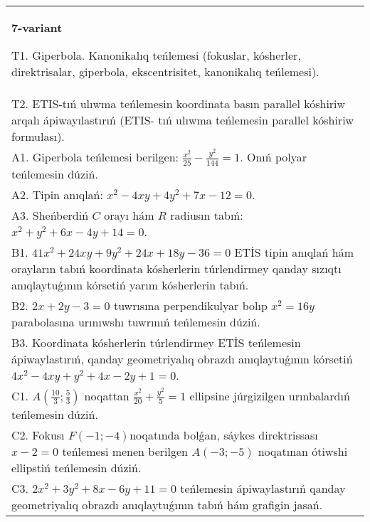 \documentclass{article}
\begin{document}
\begin{tabular}{m{17cm}}
\textbf{7-variant}
\newline

T1. Giperbola. Kanonikalıq teńlemesi (fokuslar, kósherler, direktrisalar, giperbola, ekscentrisitet, kanonikalıq teńlemesi).\\

T2. ETIS-tıń ulıwma teńlemesin koordinata basın parallel kóshiriw arqalı ápiwayılastırıń (ETIS- tıń ulıwma teńlemesin parallel kóshiriw formulası).\\

A1. Giperbola teńlemesi berilgen: $\frac{x^{2}}{25}-\frac{y^{2}}{144}=1$. Onıń polyar teńlemesin dúziń.\\

A2. Tipin anıqlań: $x^{2}-4 xy+4 y^{2}+7 x-12=0$.\\

A3. Sheńberdiń $C$ orayı hám $R$ radiusın tabıń: $x^2+y^2+6 x-4 y+14=0$.\\

B1. $41x^{2} + 24xy + 9y^{2} + 24x + 18y - 36 = 0$ ETİS tipin anıqlań hám orayların tabıń koordinata kósherlerin túrlendirmey qanday sızıqtı anıqlaytuǵının kórsetiń yarım kósherlerin tabıń.  \\

B2. $2x + 2y - 3 = 0$ tuwrısına perpendikulyar bolıp $x^{2} = 16y$ parabolasına urınıwshı tuwrınıń teńlemesin dúziń.  \\

B3. Koordinata kósherlerin túrlendirmey ETİS teńlemesin ápiwaylastırıń, qanday geometriyalıq obrazdı anıqlaytuǵının kórsetiń $4x^{2} - 4xy + y^{2} + 4x - 2y + 1 = 0$.  \\

C1. $A(\frac{10}{3};\frac{5}{3})$ noqattan $\frac{x^{2}}{20} + \frac{y^{2}}{5} = 1$ ellipsine júrgizilgen urınbalardıń teńlemesin dúziń.  \\

C2. Fokusı $F( - 1; - 4)$noqatında bolǵan, sáykes direktrissası $x - 2 = 0$ teńlemesi menen berilgen $A( - 3; - 5)$ noqatınan ótiwshi ellipstiń teńlemesin dúziń.  \\

C3. $2x^{2} + 3y^{2} + 8x - 6y + 11 = 0$ teńlemesin ápiwaylastırıń qanday geometriyalıq obrazdı anıqlaytuǵının tabıń hám grafigin jasań.  \\

\end{tabular}
\vspace{1cm}
\end{document}
